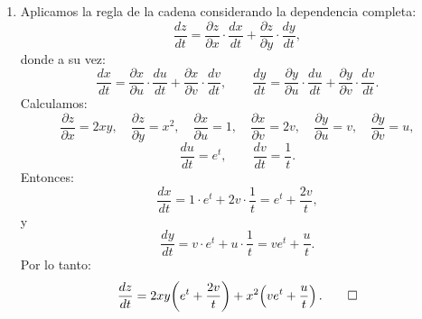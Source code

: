 \documentclass[10pt,a5]{aleph-examen}
\begin{document}
\begin{preguntas}
\begin{respuesta}
\begin{enumerate}
    \item Aplicamos la regla de la cadena considerando la dependencia completa:
    \[
        \frac{dz}{dt}
        =
        \frac{\partial z}{\partial x}\cdot\frac{dx}{dt}
        +
        \frac{\partial z}{\partial y}\cdot\frac{dy}{dt},
    \]
    donde a su vez:
    \[
        \frac{dx}{dt}
        =
        \frac{\partial x}{\partial u}\cdot\frac{du}{dt}
        +
        \frac{\partial x}{\partial v}\cdot\frac{dv}{dt},
        \qquad
        \frac{dy}{dt}
        =
        \frac{\partial y}{\partial u}\cdot\frac{du}{dt}
        +
        \frac{\partial y}{\partial v}\cdot\frac{dv}{dt}.
    \]
    Calculamos:
    \[
        \frac{\partial z}{\partial x}=2xy,\quad
        \frac{\partial z}{\partial y}=x^2,\quad
        \frac{\partial x}{\partial u}=1,\quad
        \frac{\partial x}{\partial v}=2v,\quad
        \frac{\partial y}{\partial u}=v,\quad
        \frac{\partial y}{\partial v}=u,
    \]
    \[
        \frac{du}{dt}=e^t,\qquad\frac{dv}{dt}=\frac{1}{t}.
    \]
    Entonces:
    \[
        \frac{dx}{dt}
        =
        1\cdot e^t+2v\cdot\frac{1}{t}
        =
        e^t+\frac{2v}{t},
    \]
    y
    \[
        \frac{dy}{dt}
        =
        v\cdot e^t+u\cdot\frac{1}{t}
        =
        ve^t+\frac{u}{t}.
    \]
    Por lo tanto:
    \[
        \frac{dz}{dt}
        =
        2xy\!\left(e^t+\frac{2v}{t}\right)+x^2\!\left(ve^t+\frac{u}{t}\right).\qedhere
    \]
\end{enumerate}
\end{respuesta}


\end{preguntas}
\end{document}
